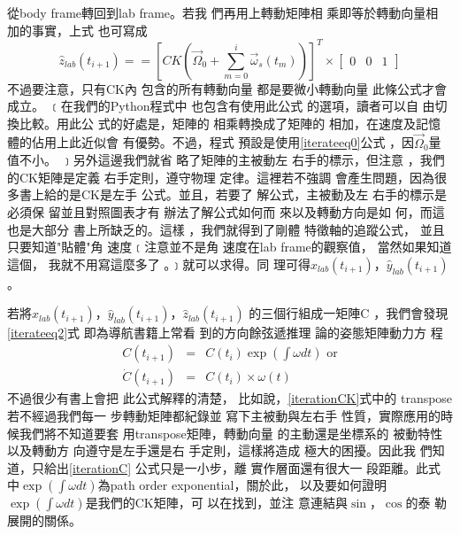 \documentclass[12pt,twoside]{article}
\begin{document}
從body frame轉回到lab frame。若我%
們再用上轉動矩陣相%
乘即等於轉動向量相%
加的事實\cite{goldstein}，上式%
也可寫成%
\begin{equation}
\hat{z}_{lab}\left( t_{i+1}\right) ==\left[ CK\left( \vec{\Omega}%
_{0}+\sum\limits_{m=0}^{i}\vec{\omega}_{s}\left( t_{m}\right) \right) \right]
^{T}\times \left[ 
\begin{array}{ccc}
0 & 0 & 1%
\end{array}%
\right]  \label{iterateeq2}
\end{equation}%
不過要注意，只有CK內%
包含的所有轉動向量%
都是要微小轉動向量%
此條公式才會成立。%
﹝在我們的Python程式中%
也包含有使用此公式%
的選項，讀者可以自%
由切換比較。用此公%
式的好處是，矩陣的%
相乘轉換成了矩陣的%
相加，在速度及記憶%
體的佔用上此近似會%
有優勢。不過，程式%
預設是使用\ref{iterateeq0}公式%
，因$\vec{\Omega}_{0}$量值不小。%
﹞另外這邊我們就省%
略了矩陣的主被動左%
右手的標示，但注意%
，我們的CK矩陣是定義%
右手定則，遵守物理%
定律。這裡若不強調%
會產生問題，因為很%
多書上給的是CK是左手%
公式。並且，若要了%
解公式，主被動及左%
右手的標示是必須保%
留並且對照圖表才有%
辦法了解公式如何而%
來以及轉動方向是如%
何，而這也是大部分%
書上所缺乏的。這樣%
，我們就得到了剛體%
特徵軸的追蹤公式，%
並且只要知道"貼體"角%
速度﹝注意並不是角%
速度在lab frame的觀察值，%
當然如果知道這個，%
我就不用寫這麼多了%
。﹞就可以求得。同%
理可得$\hat{x}_{lab}\left( t_{i+1}\right) $，$\hat{y}%
_{lab}\left( t_{i+1}\right) $。

若將$\hat{x}_{lab}\left( t_{i+1}\right) $，$\hat{y}%
_{lab}\left( t_{i+1}\right) $，$\hat{z}_{lab}\left( t_{i+1}\right) $%
的三個行組成一矩陣C%
，我們會發現\ref{iterateeq2}式%
即為導航書籍上常看%
到的方向餘弦遞推理%
論的姿態矩陣動力方%
程\cite{titterton}%
\begin{eqnarray}
C(t_{i+1}) &=&C(t_{i})\exp (\int \omega dt)\text{ or}  \label{iterationC} \\
\dot{C}(t_{i+1}) &=&C(t_{i})\times \omega (t)
\end{eqnarray}%
不過很少有書上會把%
此公式解釋的清楚，%
比如說，\ref{iterationCK}式中的%
transpose若不經過我們每一%
步轉動矩陣都紀錄並%
寫下主被動與左右手%
性質，實際應用的時%
候我們將不知道要套%
用transpose矩陣，轉動向量%
的主動還是坐標系的%
被動特性以及轉動方%
向遵守是左手還是右%
手定則，這樣將造成%
極大的困擾。因此我%
們知道，只給出\ref{iterationC}%
公式只是一小步，離%
實作層面還有很大一%
段距離。此式中$\exp (\int \omega
dt)$為path order exponential，關於此，%
以及要如何證明$\exp (\int \omega
dt)$是我們的CK矩陣，可%
以在\cite[Page 49]{tong}找到，並注%
意連結與$\sin $，$\cos $的泰%
勒展開的關係。
\end{document}
